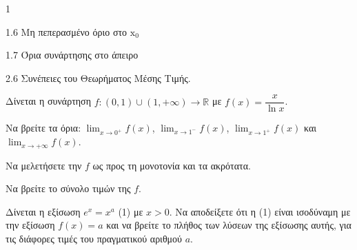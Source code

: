 \begin{ylh}{1}
    \item 1.6 Μη πεπερασμένο όριο στο $\mathrm{x}_0$
    \item 1.7 Όρια συνάρτησης στο άπειρο
    \item 2.6 Συνέπειες του Θεωρήματος Μέσης Τιμής.
\end{ylh}
Δίνεται η συνάρτηση $f : (0, 1) \cup (1, +\infty) \to \mathbb{R}$ με $f(x) = \dfrac{x}{\ln x}$.
\begin{alist}
\item Να βρείτε τα όρια: $\lim_{x \to 0^+} f(x)$, $\lim_{x \to 1^-} f(x)$, $\lim_{x \to 1^+} f(x)$ και $\lim_{x \to +\infty} f(x)$. 
\item \begin{rlist}
    \item Να μελετήσετε την $f$ ως προς τη μονοτονία και τα ακρότατα. 
    \item Να βρείτε το σύνολο τιμών της $f$. 
\end{rlist}
\item Δίνεται η εξίσωση $e^x = x^a$ (1) με $x > 0$. Να αποδείξετε ότι η (1) είναι ισοδύναμη με την εξίσωση $f(x) = a$ και να βρείτε το πλήθος των λύσεων της εξίσωσης αυτής, για τις διάφορες τιμές του πραγματικού αριθμού $a$. 
\end{alist}
